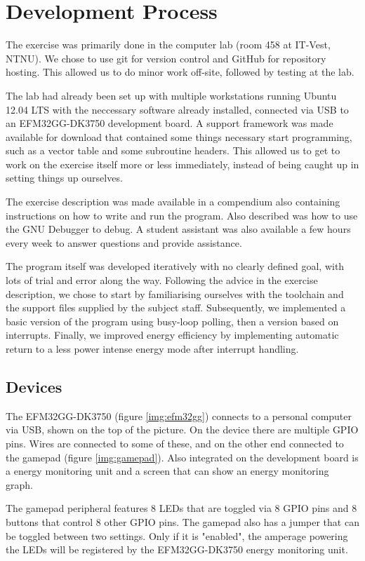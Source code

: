 \section{Development Process}
The exercise was primarily done in the computer lab (room 458 at IT-Vest, NTNU). We chose to use git for version control and GitHub for repository hosting. This allowed us to do minor work off-site, followed by testing at the lab.

The lab had already been set up with multiple workstations running Ubuntu 12.04 LTS with the neccessary software already installed, connected via USB to an EFM32GG-DK3750 development board. A support framework was made available for download that contained some things necessary start programming, such as a vector table and some subroutine headers. This allowed us to get to work on the exercise itself more or less immediately, instead of being caught up in setting things up ourselves.

The exercise description was made available in a compendium also containing instructions on how to write and run the program. Also described was how to use the GNU Debugger to debug. A student assistant was also available a few hours every week to answer questions and provide assistance.

The program itself was developed iteratively with no clearly defined goal, with lots of trial and error along the way. Following the advice in the exercise description, we chose to start by familiarising ourselves with the toolchain and the support files supplied by the subject staff. Subsequently, we implemented a basic version of the program using busy-loop polling, then a version based on interrupts. Finally, we improved energy efficiency by implementing automatic return to a less power intense energy mode after interrupt handling.

\subsection{Devices}\label{devices}
The EFM32GG-DK3750 (figure \ref{img:efm32gg}) connects to a personal computer via USB, shown on the top of the picture. On the device there are multiple GPIO pins. Wires are connected to some of these, and on the other end connected to the gamepad (figure \ref{img:gamepad}). Also integrated on the development board is a energy monitoring unit and a screen that can show an energy monitoring graph.

The gamepad peripheral features 8 LEDs that are toggled via 8 GPIO pins and 8 buttons that control 8 other GPIO pins. The gamepad also has a jumper that can be toggled between two settings. Only if it is "enabled", the amperage powering the LEDs will be registered by the EFM32GG-DK3750 energy monitoring unit.

